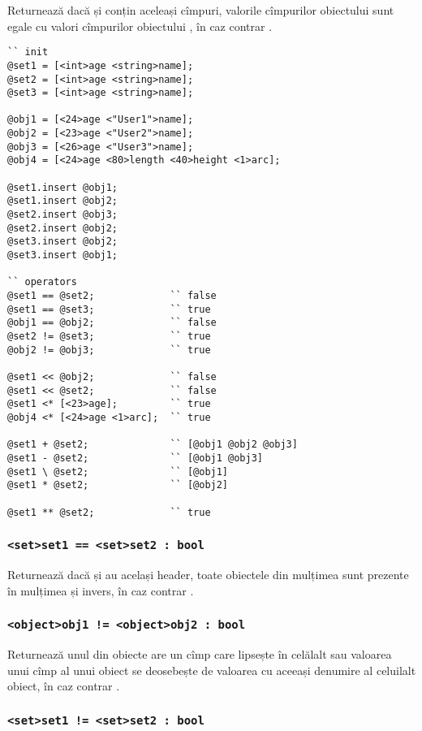 Returnează \true{} dacă  și  conțin aceleași cîmpuri, valorile cîmpurilor obiectului  sunt egale cu valori cîmpurilor obiectului , în caz contrar \false{}.

\begin{lstlisting}[caption=Exemple de folosire al operatorilor asupra tipului object și set, label=setobjopex]
`` init
@set1 = [<int>age <string>name];
@set2 = [<int>age <string>name];
@set3 = [<int>age <string>name];

@obj1 = [<24>age <"User1">name];
@obj2 = [<23>age <"User2">name];
@obj3 = [<26>age <"User3">name];
@obj4 = [<24>age <80>length <40>height <1>arc];

@set1.insert @obj1;
@set1.insert @obj2;
@set2.insert @obj3;
@set2.insert @obj2;
@set3.insert @obj2;
@set3.insert @obj1;

`` operators
@set1 == @set2;				`` false
@set1 == @set3;				`` true
@obj1 == @obj2;				`` false
@set2 != @set3;				`` true
@obj2 != @obj3;				`` true

@set1 << @obj2;				`` false
@set1 << @set2;				`` false
@set1 <* [<23>age];			`` true
@obj4 <* [<24>age <1>arc];	`` true

@set1 + @set2;				`` [@obj1 @obj2 @obj3]
@set1 - @set2;				`` [@obj1 @obj3]
@set1 \ @set2;				`` [@obj1]
@set1 * @set2;				`` [@obj2]

@set1 ** @set2;				`` true
\end{lstlisting}

\subsubsection{\lstinline|<set>set1 == <set>set2 : bool|}

Returnează \true{} dacă  și  au același header, toate obiectele din mulțimea  sunt prezente în mulțimea  și invers, în caz contrar \false{}.

\subsubsection{\lstinline|<object>obj1 != <object>obj2 : bool|}

Returnează \true{} unul din obiecte are un cîmp care lipsește în celălalt sau valoarea unui cîmp al unui obiect se deosebește de valoarea cu aceeași denumire al celuilalt obiect, în caz contrar \false{}.

\subsubsection{\lstinline|<set>set1 != <set>set2 : bool|}

